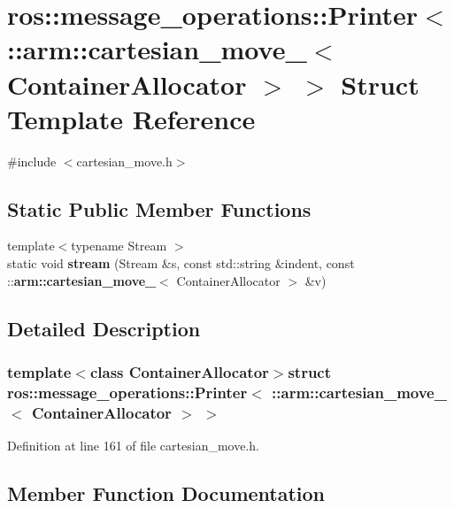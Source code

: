 \section{ros\-:\-:message\-\_\-operations\-:\-:\-Printer$<$ \-:\-:arm\-:\-:cartesian\-\_\-move\-\_\-$<$ \-Container\-Allocator $>$ $>$ \-Struct \-Template \-Reference}
\label{structros_1_1message__operations_1_1Printer_3_01_1_1arm_1_1cartesian__move___3_01ContainerAllocator_01_4_01_4}


{\ttfamily \#include $<$cartesian\-\_\-move.\-h$>$}

\subsection*{\-Static \-Public \-Member \-Functions}
\begin{DoxyCompactItemize}
\item 
{\footnotesize template$<$typename Stream $>$ }\\static void {\bf stream} (\-Stream \&s, const std\-::string \&indent, const \-::{\bf arm\-::cartesian\-\_\-move\-\_\-}$<$ \-Container\-Allocator $>$ \&v)
\end{DoxyCompactItemize}


\subsection{\-Detailed \-Description}
\subsubsection*{template$<$class Container\-Allocator$>$struct ros\-::message\-\_\-operations\-::\-Printer$<$ \-::arm\-::cartesian\-\_\-move\-\_\-$<$ Container\-Allocator $>$ $>$}



\-Definition at line 161 of file cartesian\-\_\-move.\-h.



\subsection{\-Member \-Function \-Documentation}

